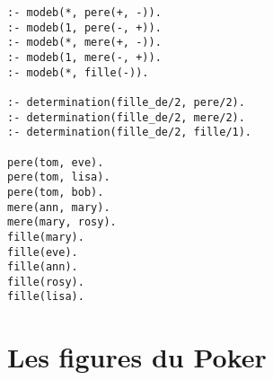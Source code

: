 \documentclass[a4paper,12pt]{article}
\begin{document}
\begin{lstlisting}[frame=single]
:- modeb(*, pere(+, -)).
:- modeb(1, pere(-, +)).
:- modeb(*, mere(+, -)).
:- modeb(1, mere(-, +)).
:- modeb(*, fille(-)).

:- determination(fille_de/2, pere/2).
:- determination(fille_de/2, mere/2).
:- determination(fille_de/2, fille/1).

pere(tom, eve).
pere(tom, lisa).
pere(tom, bob).
mere(ann, mary).
mere(mary, rosy).
fille(mary).
fille(eve).
fille(ann).
fille(rosy).
fille(lisa).
\end{lstlisting}

\section{Les figures du Poker}
\end{document}
